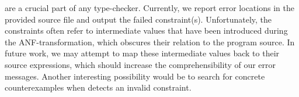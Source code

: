  are a crucial part of any type-checker.
Currently, we report error locations in the provided source
file and output the failed constraint(s). Unfortunately, the
constraints often refer to intermediate values that
have been introduced during the ANF-transformation, which
obscures their relation to the program source. In future work,
we may attempt to map these intermediate values back to their
source expressions, which should increase the comprehensibility
of our error messages. Another interesting possibility would be
to search for concrete counterexamples when \toolname detects an
invalid constraint.





